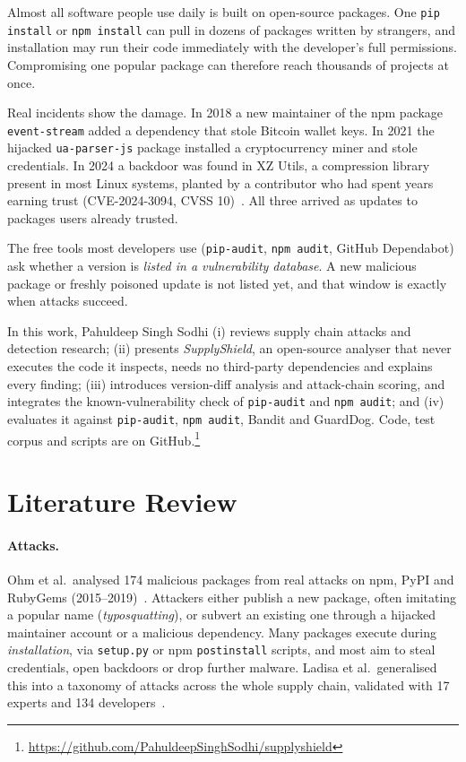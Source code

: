\documentclass[runningheads]{llncs}
\begin{document}
Almost all software people use daily is built on open-source packages. One \texttt{pip install} or \texttt{npm install} can pull in dozens of packages written by strangers, and installation may run their code immediately with the developer's full permissions. Compromising one popular package can therefore reach thousands of projects at once.

Real incidents show the damage. In 2018 a new maintainer of the npm package \texttt{event-stream} added a dependency that stole Bitcoin wallet keys. In 2021 the hijacked \texttt{ua-parser-js} package installed a cryptocurrency miner and stole credentials. In 2024 a backdoor was found in XZ Utils, a compression library present in most Linux systems, planted by a contributor who had spent years earning trust (CVE-2024-3094, CVSS 10)~\cite{nvd_xz}. All three arrived as updates to packages users already trusted.

The free tools most developers use (\texttt{pip-audit}, \texttt{npm audit}, GitHub Dependabot) ask whether a version is \emph{listed in a vulnerability database}. A new malicious package or freshly poisoned update is not listed yet, and that window is exactly when attacks succeed.

In this work, Pahuldeep Singh Sodhi (i) reviews supply chain attacks and detection research; (ii) presents \emph{SupplyShield}, an open-source analyser that never executes the code it inspects, needs no third-party dependencies and explains every finding; (iii) introduces version-diff analysis and attack-chain scoring, and integrates the known-vulnerability check of \texttt{pip-audit} and \texttt{npm audit}; and (iv) evaluates it against \texttt{pip-audit}, \texttt{npm audit}, Bandit and GuardDog. Code, test corpus and scripts are on GitHub.\footnote{\url{https://github.com/PahuldeepSinghSodhi/supplyshield}}

\section{Literature Review}\label{sec:lit}

\paragraph{Attacks.} Ohm et al.\ analysed 174 malicious packages from real attacks on npm, PyPI and RubyGems (2015--2019)~\cite{ohm2020backstabber}. Attackers either publish a new package, often imitating a popular name (\emph{typosquatting}), or subvert an existing one through a hijacked maintainer account or a malicious dependency. Many packages execute during \emph{installation}, via \texttt{setup.py} or npm \texttt{postinstall} scripts, and most aim to steal credentials, open backdoors or drop further malware. Ladisa et al.\ generalised this into a taxonomy of attacks across the whole supply chain, validated with 17 experts and 134 developers~\cite{ladisa2023taxonomy}.
\end{document}
